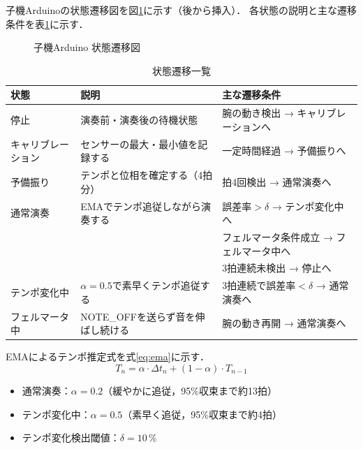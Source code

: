 子機Arduinoの状態遷移図を図\ref{fig:state}に示す（後から挿入）．
各状態の説明と主な遷移条件を表\ref{tab:states}に示す．

\begin{figure}[H]
  \centering
  \caption{子機Arduino 状態遷移図}
  \label{fig:state}
\end{figure}

\begin{table}[H]
  \centering
  \begin{tabularx}{\linewidth}{lXX}
    \toprule
    状態 & 説明 & 主な遷移条件 \\
    \midrule
    停止 &
      演奏前・演奏後の待機状態 &
      腕の動き検出 → キャリブレーションへ \\
    キャリブレーション &
      センサーの最大・最小値を記録する &
      一定時間経過 → 予備振りへ \\
    予備振り &
      テンポと位相を確定する（4拍分） &
      拍4回検出 → 通常演奏へ \\
    通常演奏 &
      EMAでテンポ追従しながら演奏する &
      誤差率$> \delta$ → テンポ変化中へ \\
      & &
      フェルマータ条件成立 → フェルマータ中へ \\
      & &
      3拍連続未検出 → 停止へ \\
    テンポ変化中 &
      $\alpha=0.5$で素早くテンポ追従する &
      3拍連続で誤差率$< \delta$ → 通常演奏へ \\
    フェルマータ中 &
      NOTE\_OFFを送らず音を伸ばし続ける &
      腕の動き再開 → 通常演奏へ \\
    \bottomrule
  \end{tabularx}
  \caption{状態遷移一覧}
  \label{tab:states}
\end{table}

EMAによるテンポ推定式を式\eqref{eq:ema}に示す．
\begin{equation}
  T_n = \alpha \cdot \Delta t_n + (1 - \alpha) \cdot T_{n-1}
  \label{eq:ema}
\end{equation}
\begin{itemize}
  \item 通常演奏：$\alpha = 0.2$（緩やかに追従，95\%収束まで約13拍）
  \item テンポ変化中：$\alpha = 0.5$（素早く追従，95\%収束まで約4拍）
  \item テンポ変化検出閾値：$\delta = 10\,\%$
\end{itemize}
